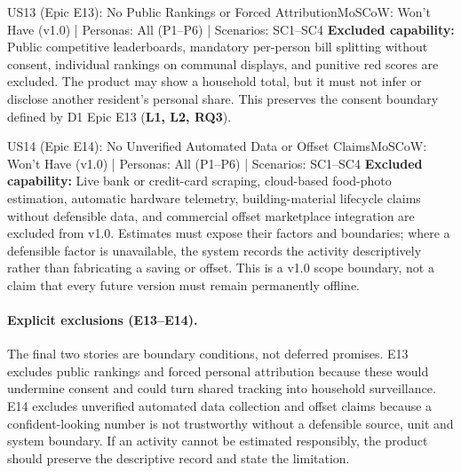 \documentclass[12pt,a4paper]{article}
\begin{document}
\begin{storybox}{US13 (Epic E13): No Public Rankings or Forced Attribution}{MoSCoW: Won't Have (v1.0) | Personas: All (P1--P6) | Scenarios: SC1--SC4}
\textbf{Excluded capability:} Public competitive leaderboards, mandatory per-person bill splitting without consent, individual rankings on communal displays, and punitive red scores are excluded. The product may show a household total, but it must not infer or disclose another resident's personal share. This preserves the consent boundary defined by D1 Epic E13 (\textbf{L1, L2, RQ3}).
\end{storybox}

\begin{storybox}{US14 (Epic E14): No Unverified Automated Data or Offset Claims}{MoSCoW: Won't Have (v1.0) | Personas: All (P1--P6) | Scenarios: SC1--SC4}
\textbf{Excluded capability:} Live bank or credit-card scraping, cloud-based food-photo estimation, automatic hardware telemetry, building-material lifecycle claims without defensible data, and commercial offset marketplace integration are excluded from v1.0. Estimates must expose their factors and boundaries; where a defensible factor is unavailable, the system records the activity descriptively rather than fabricating a saving or offset. This is a v1.0 scope boundary, not a claim that every future version must remain permanently offline.
\end{storybox}

\paragraph{Explicit exclusions (E13--E14).}
The final two stories are boundary conditions, not deferred promises. E13 excludes public rankings and forced personal attribution because these would undermine consent and could turn shared tracking into household surveillance. E14 excludes unverified automated data collection and offset claims because a confident-looking number is not trustworthy without a defensible source, unit and system boundary. If an activity cannot be estimated responsibly, the product should preserve the descriptive record and state the limitation.


\end{document}

